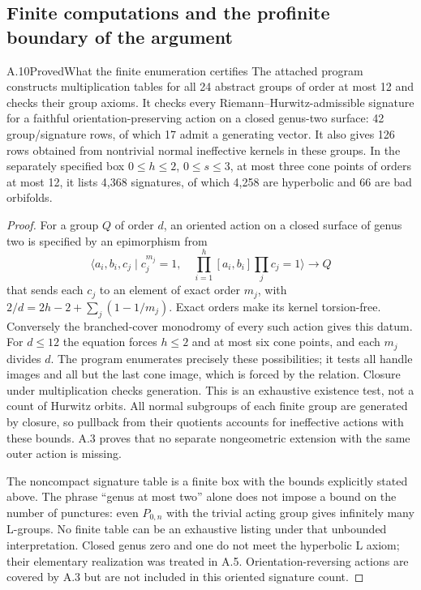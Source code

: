 \subsection{Finite computations and the profinite boundary of the argument}

\begin{statement}{A.10}{Proved}{What the finite enumeration certifies}
The attached program constructs multiplication tables for all 24
abstract groups of order at most 12 and checks their group axioms.
It checks every Riemann--Hurwitz-admissible signature for a
faithful orientation-preserving action on a closed genus-two
surface: 42 group/signature rows, of which 17 admit a generating
vector. It also gives 126 rows obtained from nontrivial normal
ineffective kernels in these groups. In the separately specified
box $0\leq h\leq2$, $0\leq s\leq3$, at most three cone points
of orders at most 12, it lists 4,368 signatures, of which 4,258
are hyperbolic and 66 are bad orbifolds.
\end{statement}
\begin{proof}
For a group $Q$ of order $d$, an oriented action on a closed
surface of genus two is specified by an epimorphism from
\[
 \bigl\langle a_i,b_i,c_j\mid c_j^{m_j}=1,\quad
       \prod_{i=1}^{h}[a_i,b_i]\prod_jc_j=1\bigr\rangle
       \longrightarrow Q
\]
that sends each $c_j$ to an element of exact order $m_j$, with
$2/d=2h-2+\sum_j(1-1/m_j)$. Exact orders make its kernel
torsion-free. Conversely the branched-cover monodromy of every
such action gives this datum. For $d\leq12$ the equation forces
$h\leq2$ and at most six cone points, and each $m_j$ divides $d$.
The program enumerates precisely these possibilities; it tests
all handle images and all but the last cone image, which is
forced by the relation. Closure under multiplication checks
generation. This is an exhaustive existence test, not a count
of Hurwitz orbits. All normal subgroups of each finite group
are generated by closure, so pullback from their quotients
accounts for ineffective actions with these bounds. A.3 proves
that no separate nongeometric extension with the same outer
action is missing.

The noncompact signature table is a finite box with the bounds
explicitly stated above. The phrase ``genus at most two'' alone
does not impose a bound on the number of punctures: even
$P_{0,n}$ with the trivial acting group gives infinitely many
L-groups. No finite table can be an exhaustive listing under
that unbounded interpretation. Closed genus zero and one do
not meet the hyperbolic L axiom; their elementary realization
was treated in A.5. Orientation-reversing actions are covered
by A.3 but are not included in this oriented signature count.
\end{proof}

